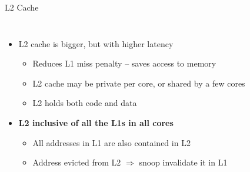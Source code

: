 \documentclass[aspectratio=169,12pt]{beamer}
\begin{document}


\newcommand{\mesistate}[2]{%
  \tikz[baseline=(char.base)] \node[circle, draw, thick, fill=#2, minimum size=0.5cm, inner sep=1pt] (char) {\textbf{#1}};
}

\begin{frame}{L2 Cache}
  \begin{columns}
    \begin{itemize}
      \item L2 cache is \alert{bigger}, but with \alert{higher latency}
      \begin{itemize}
        \item Reduces L1 miss penalty -- saves access to memory
        \item L2 cache may be private per core, or shared by a few cores
        \item L2 holds both code and data
      \end{itemize}
      \item \textbf{L2 inclusive of all the L1s in all cores}
      \begin{itemize}
        \item All addresses in L1 are also contained in L2
        \item Address evicted from L2 $\Rightarrow$ snoop invalidate it in L1
      \end{itemize}
    \end{itemize}
    
\end{columns}
\end{frame}
\end{document}
